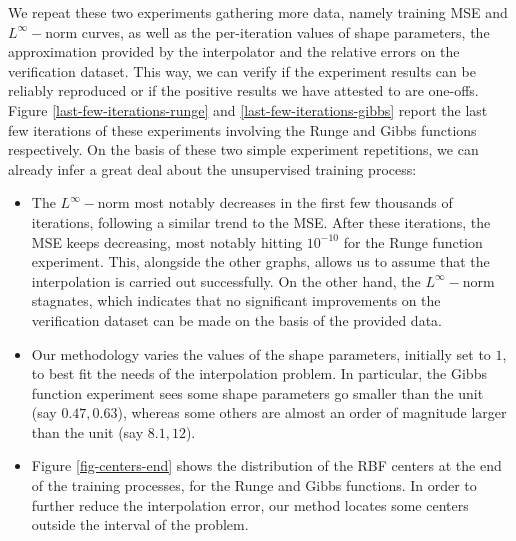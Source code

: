 \documentclass[12pt]{report} %
\begin{document}
We repeat these two experiments gathering more data, namely training MSE and
$L^{\infty} -$norm curves, as well as the per-iteration values of shape parameters,
the approximation provided by the interpolator and the relative errors on the verification dataset. This way, we can verify if the
experiment results can be reliably reproduced or if the positive results we have attested to are one-offs.
Figure \ref{last-few-iterations-runge} and \ref{last-few-iterations-gibbs}
report the last few iterations of these experiments involving the Runge and
Gibbs functions respectively. On the basis of these two simple experiment
repetitions, we can already infer a great deal about the unsupervised training
process:
\begin{itemize}
  \item The $L^{\infty} -$norm most notably decreases in the first few
        thousands of iterations, following a similar trend to the MSE. After these
        iterations, the MSE keeps decreasing, most notably hitting $10^{-
              10}$ for the Runge function experiment. This, alongside the other graphs,
        allows us to assume that the interpolation is carried out
        successfully. On the other hand, the $L^{\infty} -$norm stagnates, which
        indicates that no significant improvements on the verification dataset can be made on the basis of the
        provided data.

  \item Our methodology varies the values of the shape parameters, initially
        set to $1$, to best fit the needs of the interpolation problem. In
        particular, the Gibbs function experiment sees some shape parameters go
        smaller than the unit (say $0.47, 0.63$), whereas some others are almost an
        order of magnitude larger than the unit (say $8.1, 12$).

  \item Figure \ref{fig-centers-end} shows the distribution of the RBF centers
        at the end of the training processes, for the Runge and Gibbs functions. In
        order to further reduce the interpolation error, our method locates some centers outside the interval of the problem.


\end{itemize}
\end{document}
